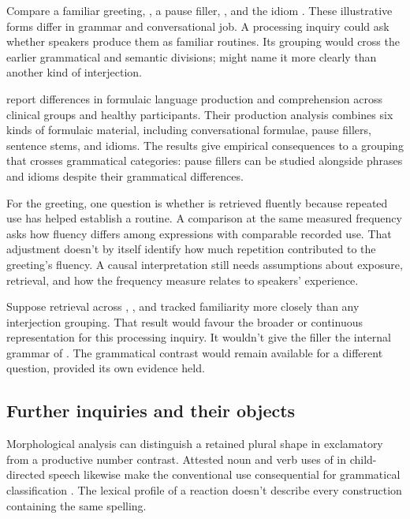 \documentclass[12pt]{article}
\begin{document}
Compare a familiar greeting, , a pause filler,
, and the idiom . These illustrative
forms differ in grammar and conversational job. A processing inquiry
could ask whether speakers produce them as familiar routines.
Its grouping would cross the earlier grammatical and semantic divisions;
 might name it more clearly than another
kind of interjection.

\textcite{vanlanckersidtis2015} report differences in formulaic
language production and comprehension across clinical groups and
healthy participants. Their production
analysis combines six kinds of formulaic material, including conversational
formulae, pause fillers, sentence stems, and idioms. The results give
empirical consequences to a grouping that crosses grammatical categories:
pause fillers can be studied alongside phrases and idioms despite
their grammatical differences.

For the greeting, one question is whether  is
retrieved fluently because repeated use has helped establish a routine.
A comparison at the same measured frequency asks how fluency differs
among expressions with comparable recorded use. That adjustment doesn't
by itself identify how much repetition contributed to the greeting's
fluency. A causal interpretation still needs assumptions about exposure,
retrieval, and how the frequency measure relates to speakers' experience.

Suppose retrieval across , , and
 tracked familiarity more closely than any
interjection grouping. That result would favour the broader or continuous
representation for this processing inquiry. It wouldn't give the filler
 the internal grammar of . The
grammatical contrast would remain available for a different question,
provided its own evidence held.

\subsection{Further inquiries and their objects}

Morphological analysis can distinguish a retained plural shape in
exclamatory  from a productive number contrast. Attested
noun and verb uses of  in child-directed speech likewise
make the conventional use consequential for grammatical classification
\citep[36]{stange2016}. The lexical profile of a reaction doesn't describe
every construction containing the same spelling.
\end{document}
